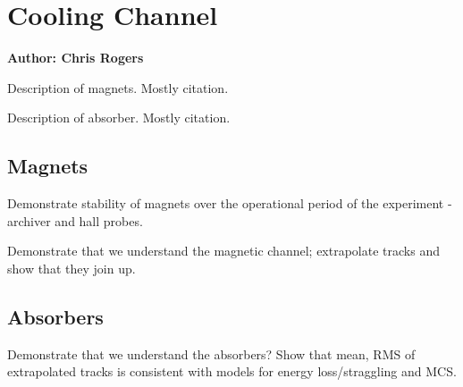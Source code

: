 \section{Cooling Channel}
\label{Sect:CoolingChannel}

\bf{Author: Chris Rogers}

Description of magnets. Mostly citation. 

Description of absorber. Mostly citation.

\subsection{Magnets}

Demonstrate stability of magnets over the operational period of the experiment -
archiver and hall probes.

Demonstrate that we understand the magnetic channel; extrapolate tracks and 
show that they join up.

\subsection{Absorbers}

Demonstrate that we understand the absorbers? Show that mean, RMS of extrapolated 
tracks is consistent with models for energy loss/straggling and MCS.

